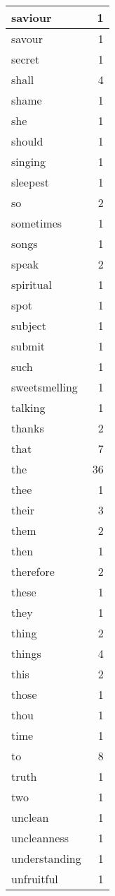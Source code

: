 \begin{center}
\begin{longtable}{l|r}
saviour & 1\\ \hline 
savour & 1\\ \hline 
secret & 1\\ \hline 
shall & 4\\ \hline 
shame & 1\\ \hline 
she & 1\\ \hline 
should & 1\\ \hline 
singing & 1\\ \hline 
sleepest & 1\\ \hline 
so & 2\\ \hline 
sometimes & 1\\ \hline 
songs & 1\\ \hline 
speak & 2\\ \hline 
spiritual & 1\\ \hline 
spot & 1\\ \hline 
subject & 1\\ \hline 
submit & 1\\ \hline 
such & 1\\ \hline 
sweetsmelling & 1\\ \hline 
talking & 1\\ \hline 
thanks & 2\\ \hline 
that & 7\\ \hline 
the & 36\\ \hline 
thee & 1\\ \hline 
their & 3\\ \hline 
them & 2\\ \hline 
then & 1\\ \hline 
therefore & 2\\ \hline 
these & 1\\ \hline 
they & 1\\ \hline 
thing & 2\\ \hline 
things & 4\\ \hline 
this & 2\\ \hline 
those & 1\\ \hline 
thou & 1\\ \hline 
time & 1\\ \hline 
to & 8\\ \hline 
truth & 1\\ \hline 
two & 1\\ \hline 
unclean & 1\\ \hline 
uncleanness & 1\\ \hline 
understanding & 1\\ \hline 
unfruitful & 1\\ \hline 

\end{longtable}
\end{center}
